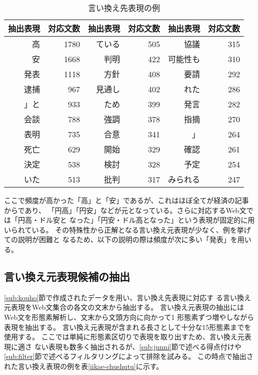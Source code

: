 \documentclass[jnlpbbl]{jnlp_j}
\begin{document}
\begin{table}[htb]
\caption{言い換え先表現の例}
\label{kouho_space}
\begin{center}
\begin{tabular}{|r|r||r|r||r|r|} \hline
抽出表現 & 対応文数 & 抽出表現 & 対応文数 & 抽出表現 & 対応文数  \\\hline\hline
高 & 1780    & ている & 505  & 協議 & 315   \\\hline
安 & 1668    & 判明 & 422    & 可能性も & 310  \\\hline
発表 & 1118  & 方針 & 408    & 要請 & 292 \\\hline
逮捕 & 967   & 見通し & 402  & れた & 286 \\\hline
」と & 933   & ため & 399    & 発言 & 282 \\\hline
会談 & 788   & 強調 & 378    & 指摘 & 270 \\\hline
表明 & 735   & 合意 & 341    & 」 & 264 \\\hline
死亡 & 629   & 開始 & 329    & 確認 & 261 \\\hline
決定 & 538   & 検討 & 328    & 予定 & 254 \\\hline
いた & 513   & 批判 & 317    & みられる & 247 \\\hline
\end{tabular}
\end{center}
\end{table}

ここで頻度が高かった「高」と「安」であるが、これはほぼ全てが経済の記事
からであり、
「円高」「円安」などが元となっている。さらに対応するWeb文では「円高・ドル安と
なった」「円安・ドル高となった」という表現が固定的に用いられている。
その特殊性から正解となる言い換え元表現が少なく、例を挙げての説明が困難と
なるため、以下の説明の際は頻度が次に多い「発表」を用いる。

\subsection{言い換え元表現候補の抽出}\label{sub:webbunmatsu}

\ref{sub:kouho}節で作成されたデータを用い、言い換え先表現に対応す
る言い換え元表現をWeb文集合の各文の文末から抽出する。
言い換え元表現の抽出にはWeb文を形態素解析し、文末から文頭方向に向かって1
形態素ずつ増やしながら表現を抽出する。
言い換え元表現が含まれる長さとして十分な15形態素までを使用する。
ここでは単純に形態素区切りで表現を取り出すため、言い換え元表現に適さ
ない表現も数多く抽出されるが、\ref{sub:junni}節で述べる得点付けや
\ref{sub:filter}節で述べるフィルタリングによって排除を試みる。
この時点で抽出された言い換え表現の例を表\ref{iikae-chushutu}に示す。
\end{document}
